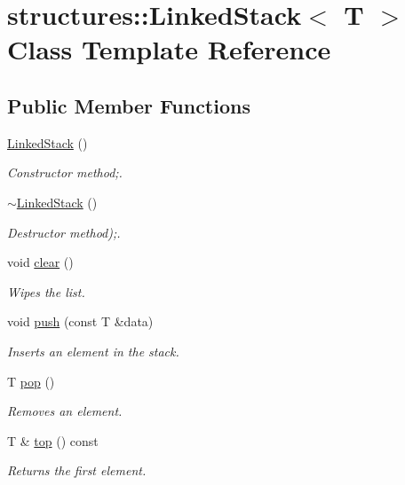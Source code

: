 \hypertarget{classstructures_1_1LinkedStack}{}\section{structures\+:\+:Linked\+Stack$<$ T $>$ Class Template Reference}
\label{classstructures_1_1LinkedStack}
\subsection*{Public Member Functions}
\begin{DoxyCompactItemize}
\item 
\mbox{\hyperlink{classstructures_1_1LinkedStack_a546b827cccaa49b4f470110bc3a9004e}{Linked\+Stack}} ()
\begin{DoxyCompactList}\small\item\em Constructor method;. \end{DoxyCompactList}\item 
\mbox{\hyperlink{classstructures_1_1LinkedStack_aae17566eb103c92eb22be2e779286f2f}{$\sim$\+Linked\+Stack}} ()
\begin{DoxyCompactList}\small\item\em Destructor method);. \end{DoxyCompactList}\item 
void \mbox{\hyperlink{classstructures_1_1LinkedStack_a56cc909b4a3a0ff7a589f35032ca0ba8}{clear}} ()
\begin{DoxyCompactList}\small\item\em Wipes the list. \end{DoxyCompactList}\item 
void \mbox{\hyperlink{classstructures_1_1LinkedStack_adb8c6b231298ac25b17ba692d510a3fc}{push}} (const T \&data)
\begin{DoxyCompactList}\small\item\em Inserts an element in the stack. \end{DoxyCompactList}\item 
T \mbox{\hyperlink{classstructures_1_1LinkedStack_a8ff0ba0de594ec26971bb259e1d28c3c}{pop}} ()
\begin{DoxyCompactList}\small\item\em Removes an element. \end{DoxyCompactList}\item 
T \& \mbox{\hyperlink{classstructures_1_1LinkedStack_a14ab6e3507dd1206a87bba8c57e1733f}{top}} () const
\begin{DoxyCompactList}\small\item\em Returns the first element. \end{DoxyCompactList}\item 

\end{DoxyCompactItemize}
